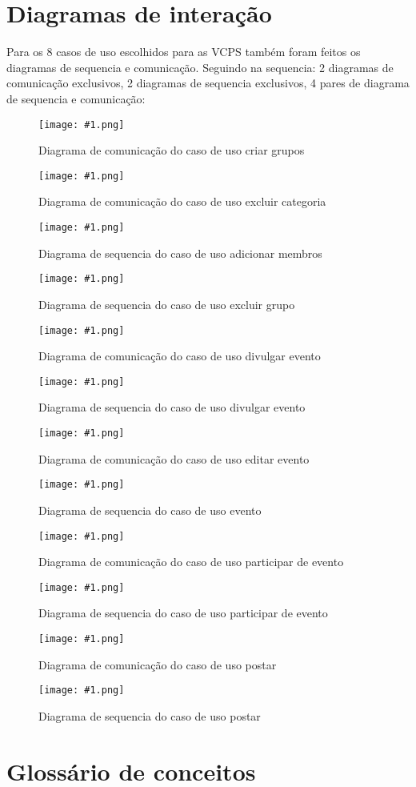 \documentclass{article}
\newcommand{\diagrama}[2]
{
 \begin{figure}[H]
 \begin{center}
 \texttt{[image: \#1.png]}
 \end{center}
 \caption{#2}
 \label{fig:#1}
 \end{figure}
}
\begin{document}
\section{Diagramas de interação}

Para os 8 casos de uso escolhidos para as VCPS também foram feitos os diagramas de sequencia e comunicação. Seguindo na sequencia: 2 diagramas de comunicação exclusivos, 2 diagramas de sequencia exclusivos, 4 pares de diagrama de sequencia e comunicação:

\diagrama{com_criargrupo1}{Diagrama de comunicação do caso de uso criar grupos}
\diagrama{com_excluirCategoria1}{Diagrama de comunicação do caso de uso excluir categoria}
\diagrama{seq_adicionarmembros1}{Diagrama de sequencia do caso de uso adicionar membros}
\diagrama{seq_excluirgrupo1}{Diagrama de sequencia do caso de uso excluir grupo}

\diagrama{com_divulgarevento2}{Diagrama de comunicação do caso de uso divulgar evento}
\diagrama{seq_divulgarevento2}{Diagrama de sequencia do caso de uso divulgar evento}

\diagrama{com_editarevento2}{Diagrama de comunicação do caso de uso editar evento}
\diagrama{seq_editarevento2}{Diagrama de sequencia do caso de uso evento}

\diagrama{com_participarevento2}{Diagrama de comunicação do caso de uso participar de evento}
\diagrama{seq_participarevento2}{Diagrama de sequencia do caso de uso participar de evento}

\diagrama{com_postar2}{Diagrama de comunicação do caso de uso postar}
\diagrama{seq_postar2}{Diagrama de sequencia do caso de uso postar}

\section{Glossário de conceitos}
    
\end{document}
